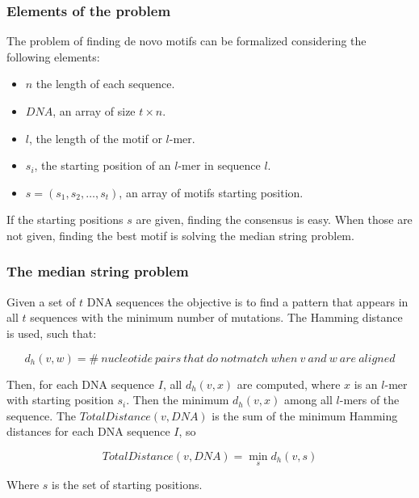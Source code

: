 		\subsubsection{Elements of the problem}
		The problem of finding de novo motifs can be formalized considering the following elements:

		\begin{multicols}{2}
			\begin{itemize}
				\item $n$ the length of each sequence.
				\item $DNA$, an array of size $t\times n$.
				\item $l$, the length of the motif or $l$-mer.
				\item $s_i$, the starting position of an $l$-mer in sequence $l$.
				\item $s = (s_1, s_2, \dots, s_t)$, an array of motifs starting position.
			\end{itemize}
		\end{multicols}

		If the starting positions $s$ are given, finding the consensus is easy.
		When those are not given, finding the best motif is solving the median string problem.

		\subsubsection{The median string problem}
		Given a set of $t$ DNA sequences the objective is to find a pattern that appears in all $t$ sequences with the minimum number of mutations.
		The Hamming distance is used, such that:

		$$d_h(v, w) = \#\ nucleotide\ pairs\ that\ do\ not match\ when\ v\ and\ w\ are\ aligned$$

		Then, for each DNA sequence $I$, all $d_h(v,x)$ are computed, where $x$ is an $l$-mer with starting position $s_i$.
		Then the minimum $d_h(v,x)$ among all $l$-mers of the sequence.
		The $TotalDistance(v,DNA)$ is the sum of the minimum Hamming distances for each DNA sequence $I$, so

		$$TotalDistance(v,DNA) = \min\limits_s d_h(v,s)$$

		Where $s$ is the set of starting positions.
